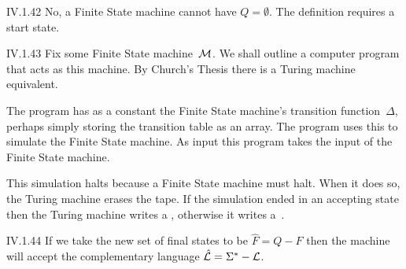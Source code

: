 %
\begin{ans}{IV.1.42}
No, a Finite State machine cannot have $Q=\emptyset$.
The definition requires a start state.
\end{ans}
%
\begin{ans}{IV.1.43}
Fix some Finite State machine~$\mathcal{M}$.
We shall  outline a computer program that acts as this machine.
By Church's Thesis there is a Turing machine equivalent.

The program has as a constant the Finite State machine's
transition function~$\Delta$,
perhaps simply storing the transition table as an array.
The program uses this to simulate the Finite State machine.
As input this program takes the input of the Finite State machine.

This simulation halts because a Finite State machine must halt.
When it does so, the Turing machine erases the tape.
If the simulation ended in an accepting state then
the Turing machine writes a , otherwise it writes a~.
\end{ans}
%
\begin{ans}{IV.1.44}
If we take the new set of final states to be $\hat{F}=Q-F$ then the
machine will accept the complementary language
$\hat{\mathcal{L}}={{\Sigma}^{*}}-\mathcal{L}$.
\end{ans}
%
